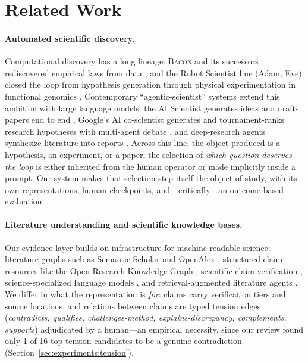 \section{Related Work}
\label{sec:related}

\paragraph{Automated scientific discovery.}
Computational discovery has a long lineage: \textsc{Bacon} and its
successors rediscovered empirical laws from data
\citep{langley1987scientific}, and the Robot Scientist line (Adam, Eve)
closed the loop from hypothesis generation through physical
experimentation in functional genomics
\citep{king2004robot,king2009automation}. Contemporary
``agentic-scientist'' systems extend this ambition with large language
models: the AI Scientist generates ideas and drafts papers end to end
\citep{lu2024aiscientist}, Google's AI co-scientist generates and
tournament-ranks research hypotheses with multi-agent debate
\citep{gottweis2025coscientist}, and deep-research agents synthesize
literature into reports \citep{openai2025deepresearch}. Across this
line, the object produced is a hypothesis, an experiment, or a paper;
the selection of \emph{which question deserves the loop} is either
inherited from the human operator or made implicitly inside a prompt.
Our system makes that selection step itself the object of study, with
its own representations, human checkpoints, and---critically---an
outcome-based evaluation.

\paragraph{Literature understanding and scientific knowledge bases.}
Our evidence layer builds on infrastructure for machine-readable
science: literature graphs such as Semantic Scholar
\citep{ammar2018construction} and OpenAlex \citep{priem2022openalex},
structured claim resources like the Open Research Knowledge Graph
\citep{jaradeh2019orkg}, scientific claim verification
\citep{wadden2020scifact}, science-specialized language models
\citep{taylor2022galactica}, and retrieval-augmented literature agents
\citep{lala2023paperqa,skarlinski2024superhuman}. We differ in what the
representation is \emph{for}: claims carry verification tiers and
source locations, and relations between claims are typed tension edges
(\emph{contradicts, qualifies, challenges-method, explains-discrepancy,
complements, supports}) adjudicated by a human---an empirical necessity,
since our review found only 1 of 16 top tension candidates to be a
genuine contradiction (Section~\ref{sec:experiments:tension}).

